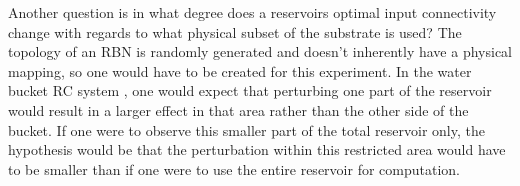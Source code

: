 Another question is in what degree does a reservoirs optimal input connectivity change with regards to what physical subset of the substrate is used?
The topology of an RBN is randomly generated and doesn't inherently have a physical mapping,
so one would have to be created for this experiment.
In the water bucket RC system \cite{fernando2003pattern},
one would expect that perturbing one part of the reservoir would result in a larger effect in that area rather than the other side of the bucket.
If one were to observe this smaller part of the total reservoir only,
the hypothesis would be that the perturbation within this restricted area would have to be smaller than if one were to use the entire reservoir for computation.
